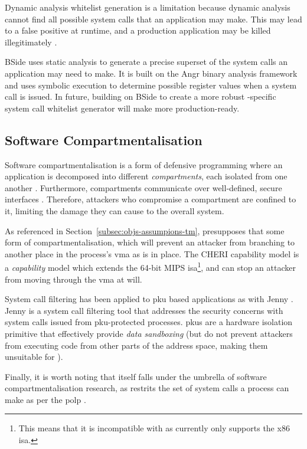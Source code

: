 Dynamic analysis whitelist generation is a limitation because dynamic analysis
cannot find all possible system calls that an application may
make. This may lead to a false positive at runtime, and a production application
may be killed illegitimately \cite{XING2022105}. 

BSide \cite{BSIDE} uses static analysis to generate a precise
superset of the system calls an application may need to make. It is built on 
the Angr \cite{angr2025} binary analysis framework and uses symbolic execution
to determine possible register values when a system call is issued. In future,
building on BSide to create a more robust \af-specific system call whitelist
generator will make \af more production-ready.

\subsection{Software Compartmentalisation}

Software compartmentalisation is a form of defensive programming where an
application is decomposed into different \textit{compartments}, each isolated
from one another \cite{SOK}. Furthermore, compartments communicate over
well-defined, secure interfaces \cite{CONFFUZZ}. Therefore, attackers who
compromise a compartment are confined to it, limiting the damage they can
cause to the overall system.

As referenced in Section~\ref{subsec:objs-assumpions-tm}, \af presupposes that some
form of compartmentalisation, which will prevent an attacker from branching to
another place in the process's \ac{vma} as is in place. The CHERI capability
model \cite{CHERI} is a \textit{capability} model which extends the 64-bit MIPS
\ac{isa}\footnote{This means that it is incompatible with \af as \af
currently only supports the x86 \ac{isa}.}, and can stop an attacker from moving through the
\ac{vma} at will. 

System call filtering has been applied to \ac{pku} based applications as with
Jenny \cite{JENNY}. Jenny is a system call filtering tool that addresses
the security concerns with system calls issued from
\ac{pku}-protected processes. \acp{pku} are a hardware isolation primitive that
effectively provide \textit{data sandboxing} (but do not prevent attackers
from executing code from other parts of the address space, making them unsuitable for
\af).

Finally, it is worth noting that \af itself falls under the umbrella of software
compartmentalisation research, as \af restrits the set of system calls a process
can make as per the \ac{polp} \cite{SALTZER_SCHROEDER}.


